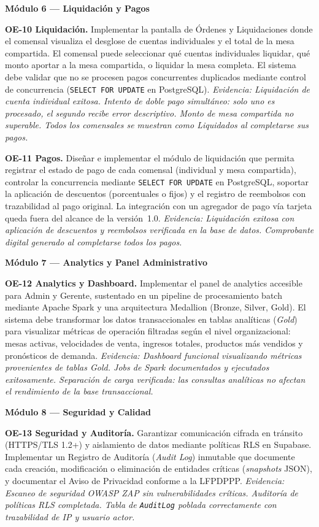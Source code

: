\noindent\textbf{Módulo 6 — Liquidación y Pagos}

\noindent\textbf{OE-10 Liquidación.}
Implementar la pantalla de Órdenes y Liquidaciones donde el comensal visualiza el
desglose de cuentas individuales y el total de la mesa compartida. El comensal puede
seleccionar qué cuentas individuales liquidar, qué monto aportar a la mesa
compartida, o liquidar la mesa completa. El sistema debe validar que no se procesen
pagos concurrentes duplicados mediante control de concurrencia
(\texttt{SELECT FOR UPDATE} en PostgreSQL).
\textit{Evidencia: Liquidación de cuenta individual exitosa. Intento de doble pago
simultáneo: solo uno es procesado, el segundo recibe error descriptivo. Monto de
mesa compartida no superable. Todos los comensales se muestran como
\textit{Liquidados} al completarse sus pagos.}

\noindent\textbf{OE-11 Pagos.}
Dise\~nar e implementar el m\'odulo de liquidaci\'on que permita registrar el estado de pago
de cada comensal (individual y mesa compartida), controlar la concurrencia mediante
\texttt{SELECT FOR UPDATE} en PostgreSQL, soportar la aplicaci\'on de descuentos (porcentuales
o fijos) y el registro de reembolsos con trazabilidad al pago original. La integraci\'on con
un agregador de pago v\'ia tarjeta queda fuera del alcance de la versi\'on~1.0.
\textit{Evidencia: Liquidaci\'on exitosa con aplicaci\'on de descuentos y reembolsos verificada
en la base de datos. Comprobante digital generado al completarse todos los pagos.}

\noindent\textbf{Módulo 7 — Analytics y Panel Administrativo}

\noindent\textbf{OE-12 Analytics y Dashboard.}
Implementar el panel de analytics accesible para Admin y Gerente, sustentado en un
pipeline de procesamiento batch mediante Apache Spark y una arquitectura Medallion
(Bronze, Silver, Gold). El sistema debe transformar los datos transaccionales en
tablas anal\'iticas (\textit{Gold}) para visualizar m\'etricas de operaci\'on
filtradas seg\'un el nivel organizacional: mesas activas, velocidades de venta,
ingresos totales, productos m\'as vendidos y pron\'osticos de demanda.
\textit{Evidencia: Dashboard funcional visualizando m\'etricas provenientes de tablas Gold.
Jobs de Spark documentados y ejecutados exitosamente. Separaci\'on de carga verificada:
las consultas anal\'iticas no afectan el rendimiento de la base transaccional.}

\noindent\textbf{Módulo 8 — Seguridad y Calidad}

\noindent\textbf{OE-13 Seguridad y Auditoría.}
Garantizar comunicación cifrada en tránsito (HTTPS/TLS 1.2+) y aislamiento de datos
mediante políticas RLS en Supabase. Implementar un Registro de Auditoría
(\textit{Audit Log}) inmutable que documente cada creación, modificación o
eliminación de entidades críticas (\textit{snapshots} JSON), y documentar el Aviso
de Privacidad conforme a la LFPDPPP.
\textit{Evidencia: Escaneo de seguridad OWASP ZAP sin vulnerabilidades críticas.
Auditoría de políticas RLS completada. Tabla de \texttt{AuditLog} poblada
correctamente con trazabilidad de IP y usuario actor.}

